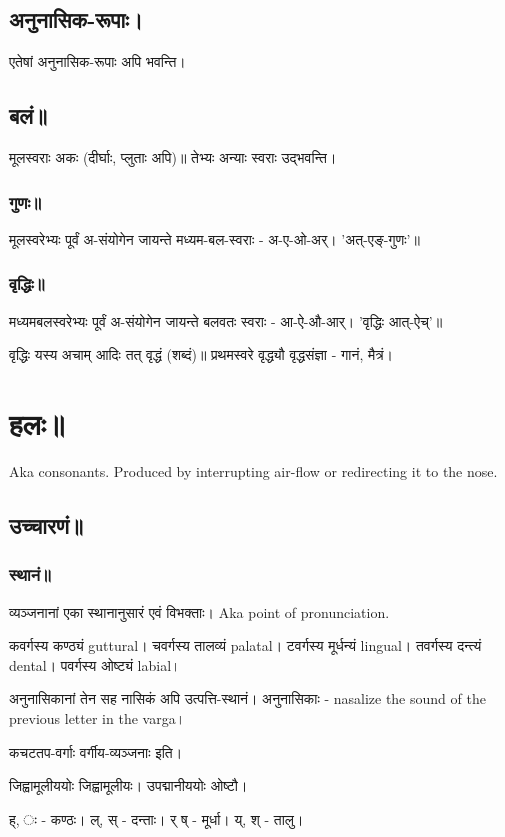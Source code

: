 \documentclass[oneside, article]{memoir}
\begin{document}
\subsection{अनुनासिक-रूपाः।}
एतेषां अनुनासिक-रूपाः अपि भवन्ति।

\subsection{बलं॥}
मूलस्वराः अकः (दीर्घाः, प्लुताः अपि)॥ तेभ्यः अन्याः स्वराः उद्भवन्ति।

\subsubsection{गुणः॥}
मूलस्वरेभ्यः पूर्वं अ-संयोगेन जायन्ते मध्यम-बल-स्वराः - अ-ए-ओ-अर्। 'अत्-एङ्-गुणः'॥

\subsubsection{वृद्धिः॥}
मध्यमबलस्वरेभ्यः पूर्वं अ-संयोगेन जायन्ते बलवतः स्वराः - आ-ऐ-औ-आर्। 'वृद्धिः आत्-ऐच्'॥

वृद्धिः यस्य अचाम् आदिः तत् वृद्धं (शब्दं)॥ प्रथमस्वरे वृद्ध्यौ वृद्धसंज्ञा - गानं, मैत्रं।

\section{हलः॥}
Aka consonants. Produced by interrupting air-flow or redirecting it to the nose.

\subsection{उच्चारणं॥}
\subsubsection{स्थानं॥}
व्यञ्जनानां एका स्थानानुसारं एवं विभक्ताः। Aka point of pronunciation.

कवर्गस्य कण्ठ्यं guttural। चवर्गस्य तालव्यं palatal। टवर्गस्य मूर्धन्यं lingual। तवर्गस्य दन्त्यं dental। पवर्गस्य ओष्ट्यं labial।

अनुनासिकानां तेन सह नासिकं अपि उत्पत्ति-स्थानं। अनुनासिकाः - nasalize the sound of the previous letter in the varga।

कचटतप-वर्गाः वर्गीय-व्यञ्जनाः इति।

जिह्वामूलीययोः जिह्वामूलीयः। उपद्मानीययोः ओष्टौ।

ह्, ः - कण्ठः। ल्, स् - दन्ताः। र् ष् - मूर्धा। य्, श् - तालु।
\end{document}
